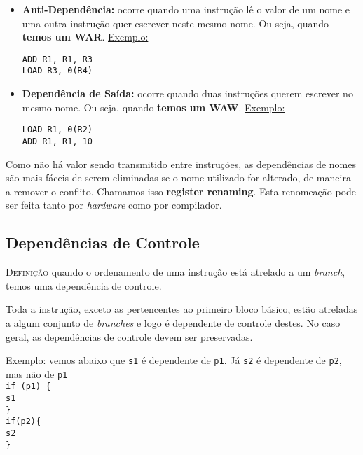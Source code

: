 \begin{itemize}
  \item \textbf{Anti-Dependência:} ocorre quando uma instrução lê o valor de um nome e uma outra instrução quer escrever neste mesmo nome. Ou seja, quando \textbf{temos um WAR}. \underline{Exemplo:}

  \begin{center}
    \texttt{ADD R1, R1, R3}\\
    \texttt{LOAD R3, 0(R4)}\\
  \end{center}

  \item \textbf{Dependência de Saída:} ocorre quando duas instruções querem escrever no mesmo nome. Ou seja, quando \textbf{temos um WAW}.
  \underline{Exemplo:}

  \begin{center}
    \texttt{LOAD R1, 0(R2)}\\
    \texttt{ADD R1, R1, 10}\\
  \end{center}
\end{itemize}

Como não há valor sendo transmitido entre instruções, as dependências de nomes são mais fáceis de serem eliminadas se o nome utilizado for alterado, de maneira a remover o conflito. Chamamos isso \textbf{register renaming}. Esta renomeação pode ser feita tanto por \textit{hardware} como por compilador.






\subsection{Dependências de Controle}
\textsc{Definição} quando o ordenamento de uma instrução está atrelado a um \textit{branch}, temos uma dependência de controle.

Toda a instrução, exceto as pertencentes ao primeiro bloco básico, estão atreladas a algum conjunto de \textit{branches} e logo é dependente de controle destes. No caso geral, as dependências de controle devem ser preservadas.

\underline{Exemplo:} vemos abaixo que \texttt{s1} é dependente de \texttt{p1}. Já \texttt{s2} é dependente de \texttt{p2}, mas não de \texttt{p1}\\

\texttt{if (p1) \{ \\  s1\\\}\\if(p2)\{\\  s2\\\}}

